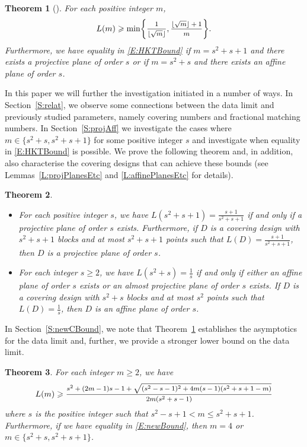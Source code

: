 \documentclass[11pt]{article}
\newtheorem{Theorem}{Theorem}[section]
\theoremstyle{definition}
\renewcommand{\leq}{\leqslant}
\renewcommand{\geq}{\geqslant}
\begin{document}
\begin{Theorem}[\cite{HalKelTia}]\label{T:HKTBound}
For each positive integer $m$,
\begin{equation}\label{E:HKTBound}
L(m) \geq \min \biggl\{ \mfrac{1}{\lfloor \sqrt{m} \rfloor}  , \mfrac{\lfloor \sqrt{m} \rfloor + 1}{m} \biggr\} .
\end{equation}
Furthermore, we have equality in \eqref{E:HKTBound} if $m=s^2+s+1$ and there exists a projective plane of order $s$ or if $m=s^2+s$ and there exists an affine plane of order $s$.
\end{Theorem}

In this paper we will further the investigation initiated in \cite{HalKelTia} a number of ways. In Section~\ref{S:relat}, we observe some connections between the data limit and previously studied parameters, namely covering numbers and fractional matching numbers. In Section~\ref{S:projAff}  we investigate the cases where $m \in \{s^2+s,s^2+s+1\}$ for some positive integer $s$ and investigate when equality in \eqref{E:HKTBound} is possible. We prove the following theorem and, in addition,
also characterise the covering designs that can achieve these bounds (see Lemmas~\ref{L:projPlanesEtc} and \ref{L:affinePlanesEtc} for details).

\begin{Theorem}\label{T:projAff} \phantom{a}
\begin{itemize}
    \item[\textup{(a)}]
For each positive integer $s$, we have $L(s^2+s+1)=\frac{s+1}{s^2+s+1}$ if and only if a projective plane of order $s$ exists. Furthermore, if $D$ is a covering design with $s^2+s+1$ blocks and at most $s^2+s+1$ points such that $L(D)=\frac{s+1}{s^2+s+1}$, then $D$ is a projective plane of order $s$.
    \item[\textup{(b)}]
For each integer $s \geq 2$, we have $L(s^2+s)=\frac{1}{s}$ if and only if either an affine plane of order $s$ exists or an almost projective plane of order $s$ exists. If $D$ is a covering design with $s^2+s$ blocks and at most $s^2$ points such that $L(D)=\frac{1}{s}$, then $D$ is an affine plane of order $s$.
\end{itemize}
\end{Theorem}

In Section~\ref{S:newCBound}, we note that Theorem~\ref{T:HKTBound} establishes the asymptotics for the data limit and, further, we provide a stronger lower bound on the data limit.

\begin{Theorem}\label{T:newBound}
For each integer $m \geq 2$, we have
\begin{equation}\label{E:newBound}
L(m) \geq \mfrac{s^2 + (2m-1)s - 1  + \sqrt{(s^2-s-1)^2 +
  4m(s-1)(s^2 + s + 1 - m)}}{2 m (s^2+s-1)}
\end{equation}
where $s$ is the positive integer such that $s^2-s+1 < m \leq s^2+s+1$. Furthermore, if we have equality in \eqref{E:newBound}, then $m=4$ or $m \in \{s^2+s,s^2+s+1\}$.
\end{Theorem}
\end{document}
